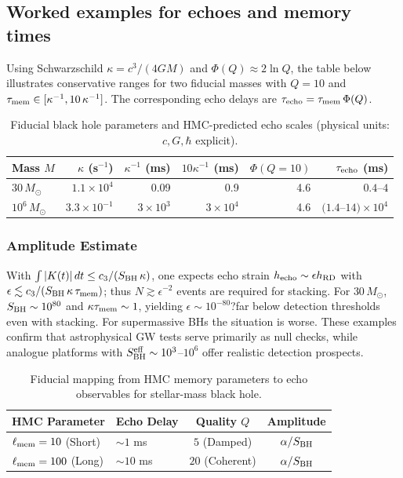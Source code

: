 \documentclass[aps,prd,preprint,onecolumn,superscriptaddress,nofootinbib,longbibliography,floatfix,11pt,showpacs,showkeys]{revtex4-2}
\newcommand{\HMC}{\textsc{HMC}\xspace}
\theoremstyle{plain}
\theoremstyle{definition}
\theoremstyle{remark}
\begin{document}
\subsection*{Worked examples for echoes and memory times}
Using Schwarzschild $\kappa=c^3/(4GM)$ and $\Phi(Q)\approx 2\ln Q$, the table below illustrates
conservative ranges for two fiducial masses with $Q=10$ and $\tau_{\rm mem}\in[\kappa^{-1},10\,\kappa^{-1}]$.
The corresponding echo delays are $\tau_{\rm echo}=\tau_{\rm mem}\,\Phi(Q)$.
\begin{table}[htbp]
\centering
\caption{Fiducial black hole parameters and \HMC{}-predicted echo scales (physical units: $c,G,\hbar$ explicit).}
\label{tab:echo-worked-examples}
\footnotesize
\begin{tabular}{lrrrrr}
\toprule
\textbf{Mass $M$} & \textbf{$\kappa$ (s$^{-1}$)} & \textbf{$\kappa^{-1}$ (ms)} & \textbf{$10\kappa^{-1}$ (ms)} & \textbf{$\Phi(Q{=}10)$} & \textbf{$\tau_{\rm echo}$ (ms)} \\
\midrule
$30\,M_\odot$ & $1.1\times 10^4$ & 0.09 & 0.9 & 4.6 & $0.4$--$4$ \\
$10^6\,M_\odot$ & $3.3\times 10^{-1}$ & $3\times 10^3$ & $3\times 10^4$ & 4.6 & $(1.4$--$14)\times 10^4$ \\
\bottomrule
\end{tabular}
\end{table}
\subsubsection{Amplitude Estimate}
With $\int |K(t)|\,dt\le c_3/(S_{\rm BH}\,\kappa)$, one expects echo strain $h_{\rm echo}\sim \epsilon h_{\rm RD}$ with
$\epsilon\lesssim c_3/(S_{\rm BH}\,\kappa\,\tau_{\rm mem})$; thus $N\gtrsim \epsilon^{-2}$ events are required for stacking.
For $30\,M_\odot$, $S_{\rm BH}\sim 10^{80}$ and $\kappa\tau_{\rm mem}\sim 1$, yielding $\epsilon\sim 10^{-80}$?far below detection thresholds even with stacking. For supermassive BHs the situation is worse. These examples confirm that astrophysical GW tests serve primarily as null checks, while analogue platforms with $S_{\rm BH}^{\rm eff}\sim 10^3$--$10^6$ offer realistic detection prospects.

\begin{table}[htbp]
\centering
\caption{Fiducial mapping from \HMC{} memory parameters to echo observables for stellar-mass black hole.}
\label{tab:echo_mapping}
\small
\begin{tabular}{@{}llcc@{}}
\toprule
\textbf{\HMC{} Parameter} & \textbf{Echo Delay} & \textbf{Quality $Q$} & \textbf{Amplitude} \\
\midrule
$\ell_{\rm mem}=10$ (Short) & $\sim 1$ ms & $5$ (Damped) & $\alpha/S_{\rm BH}$ \\
$\ell_{\rm mem}=100$ (Long) & $\sim 10$ ms & $20$ (Coherent) & $\alpha/S_{\rm BH}$ \\
\bottomrule
\end{tabular}
\end{table}
\end{document}
